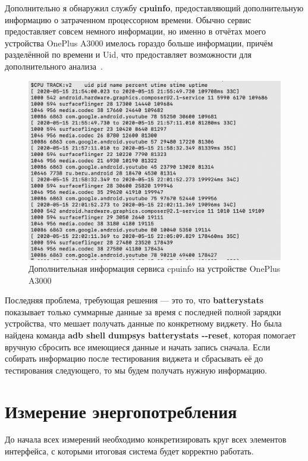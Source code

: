 \documentclass[a4paper,14pt]{extarticle} %
\begin{document}
	Дополнительно я обнаружил службу \textbf{cpuinfo}, предоставляющий дополнительную информацию о затраченном процессорном времени. Обычно сервис предоставляет совсем немного информации, но именно в отчётах моего устройства OnePlus A3000 имелось гораздо больше информации, причём разделённой по времени и Uid, что предоставляет возможности для дополнительного анализа~\ris{\ref{fig:cpuinfo}}.
	
	\begin{figure}[!htb]
		\includegraphics[width=\textwidth]{cpuinfo}
		\caption{Дополнительная информация сервиса cpuinfo на устройстве OnePlus A3000}
		\label{fig:cpuinfo}
	\end{figure}

	Последняя проблема, требующая решения --- это то, что \textbf{batterystats} показывает только суммарные данные за время с последней полной зарядки устройства, что мешает получать данные по конкретному виджету. Но была найдена команда \textbf{adb shell dumpsys batterystats -{}-reset}, которая помогает вручную сбросить все имеющиеся данные и начать запись сначала. Если собирать информацию после тестирования виджета и сбрасывать её до тестирования следующего, то мы будем получать нужную информацию.
	
	\newpage
	\section{Измерение энергопотребления}
	
	До начала всех измерений необходимо конкретизировать круг всех элементов интерфейса, с которыми итоговая система будет корректно работать.
	
\end{document}
